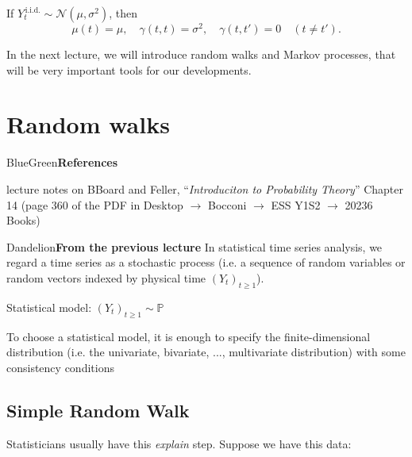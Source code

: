 \documentclass[dvipsnames,12pt]{book}
\begin{document}
                \begin{example}
                    If $Y_t^{\,\mathrm{i.i.d.}} \sim \mathcal{N}(\mu,\sigma^2)$, then
                    \[
                    \mu(t) = \mu, 
                    \quad
                    \gamma(t,t) = \sigma^2,
                    \quad
                    \gamma(t,t') = 0 \quad (t \neq t').
                    \]
                \end{example}
                
                In the next lecture, we will introduce random walks and Markov processes, that will be very important tools for our developments.


    \chapter{Random walks}

            \begin{mybox}{BlueGreen}{\textbf{References}}

                lecture notes on BBoard and Feller, ``\emph{Introduciton to Probability Theory}'' Chapter 14 (page 360 of the PDF in Desktop \(\rightarrow\) Bocconi \(\rightarrow\) ESS Y1S2 \(\rightarrow\) 20236 Books)
                
            \end{mybox}

            \begin{mybox}{Dandelion}{\textbf{From the previous lecture}}
                In statistical time series analysis, we regard a time series as a stochastic process (i.e. a sequence of random variables or random vectors indexed by physical time \((Y_t)_{t\geq1}\)).

                \noindent Statistical model: \((Y_t)_{t\geq1} \sim \mathbb{P} \)

                To choose a statistical model, it is enough to specify the finite-dimensional distribution (i.e. the univariate, bivariate, ..., multivariate distribution) with some consistency conditions
            \end{mybox}

        \section{Simple Random Walk}

            Statisticians usually have this \textit{explain} step. Suppose we have this data:
\end{document}
